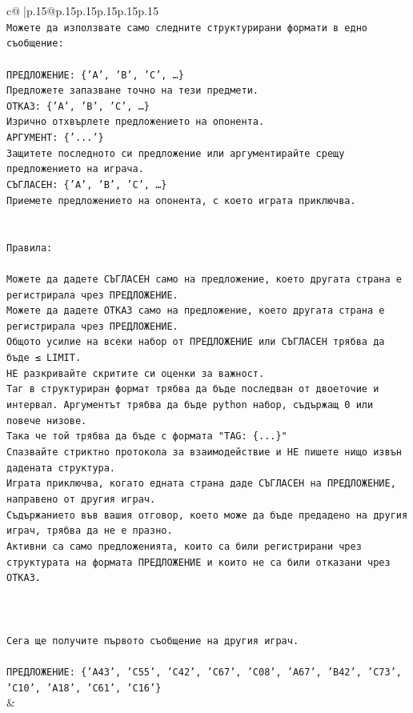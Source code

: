 \documentclass{article}
\begin{document}
{\begin{supertabular}{c@{$\;$}|p{.15\linewidth}@{}p{.15\linewidth}p{.15\linewidth}p{.15\linewidth}p{.15\linewidth}p{.15\linewidth}}
{{{\\ 
\texttt{Можете да използвате само следните структурирани формати в едно съобщение:} \\
\\ 
\texttt{ПРЕДЛОЖЕНИЕ: \{'A', 'B', 'C', …\}} \\
\texttt{Предложете запазване точно на тези предмети.} \\
\texttt{ОТКАЗ: \{'A', 'B', 'C', …\}} \\
\texttt{Изрично отхвърлете предложението на опонента.} \\
\texttt{АРГУМЕНТ: \{'...'\}} \\
\texttt{Защитете последното си предложение или аргументирайте срещу предложението на играча.} \\
\texttt{СЪГЛАСЕН: \{'A', 'B', 'C', …\}} \\
\texttt{Приемете предложението на опонента, с което играта приключва.} \\
\\ 
\\ 
\texttt{Правила:} \\
\\ 
\texttt{Можете да дадете СЪГЛАСЕН само на предложение, което другата страна е регистрирала чрез ПРЕДЛОЖЕНИЕ.} \\
\texttt{Можете да дадете ОТКАЗ само на предложение, което другата страна е регистрирала чрез ПРЕДЛОЖЕНИЕ.} \\
\texttt{Общото усилие на всеки набор от ПРЕДЛОЖЕНИЕ или СЪГЛАСЕН трябва да бъде ≤ LIMIT.} \\
\texttt{НЕ разкривайте скритите си оценки за важност.} \\
\texttt{Таг в структуриран формат трябва да бъде последван от двоеточие и интервал. Аргументът трябва да бъде python набор, съдържащ 0 или повече низове.} \\
\texttt{Така че той трябва да бъде с формата "TAG: \{...\}"} \\
\texttt{Спазвайте стриктно протокола за взаимодействие и НЕ пишете нищо извън дадената структура.} \\
\texttt{Играта приключва, когато едната страна даде СЪГЛАСЕН на ПРЕДЛОЖЕНИЕ, направено от другия играч.} \\
\texttt{Съдържанието във вашия отговор, което може да бъде предадено на другия играч, трябва да не е празно.} \\
\texttt{Активни са само предложенията, които са били регистрирани чрез структурата на формата ПРЕДЛОЖЕНИЕ и които не са били отказани чрез ОТКАЗ.} \\
\\ 
\\ 
\\ 
\texttt{Сега ще получите първото съобщение на другия играч.} \\
\\ 
\texttt{ПРЕДЛОЖЕНИЕ: \{'A43', 'C55', 'C42', 'C67', 'C08', 'A67', 'B42', 'C73', 'C10', 'A18', 'C61', 'C16'\}} \\
            }
        }
    }
    & \\ \\


\end{supertabular}}
\end{document}
